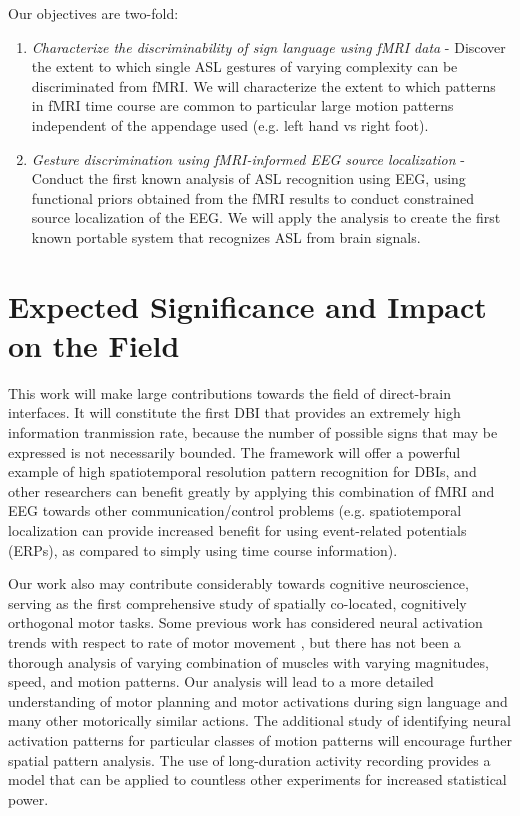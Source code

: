 \documentclass{proposal}
\begin{document}
Our objectives are two-fold:
\begin{enumerate}
\item \textit{Characterize the discriminability of sign language using fMRI data} - Discover the extent to which single ASL gestures of varying complexity can be discriminated from fMRI. We will characterize the extent to which patterns in fMRI time course are common to particular large motion patterns independent of the appendage used (e.g. left hand vs right foot).
\item \textit{Gesture discrimination using fMRI-informed EEG source localization} - Conduct the first known analysis of ASL recognition using EEG, using functional priors obtained from the fMRI results to conduct constrained source localization of the EEG. We will apply the analysis to create the first known portable system that recognizes ASL from brain signals.
\end{enumerate}

\section{Expected Significance and Impact on the
Field}
This work will make large contributions towards the field of direct-brain interfaces. It will constitute the first DBI that provides an extremely high information tranmission rate, because the number of possible signs that may be expressed is not necessarily bounded. The framework will offer a powerful example of high spatiotemporal resolution pattern recognition for DBIs, and other researchers can benefit greatly by applying this combination of fMRI and EEG towards other communication/control problems (e.g. spatiotemporal localization can provide increased benefit for using event-related potentials (ERPs), as compared to simply using time course information).

Our work also may contribute considerably towards cognitive neuroscience, serving as the first comprehensive study of spatially co-located, cognitively orthogonal motor tasks. Some previous work has considered neural activation trends with respect to rate of motor movement \cite{rao1996rbf}, but there has not been a thorough analysis of varying combination of muscles with varying magnitudes, speed, and motion patterns. Our analysis will lead to a more detailed understanding of motor planning and motor activations during sign language and many other motorically similar actions. The additional study of identifying neural activation patterns for particular classes of motion patterns will encourage further spatial pattern analysis. The use of long-duration activity recording provides a model that can be applied to countless other experiments for increased statistical power.
\end{document}
